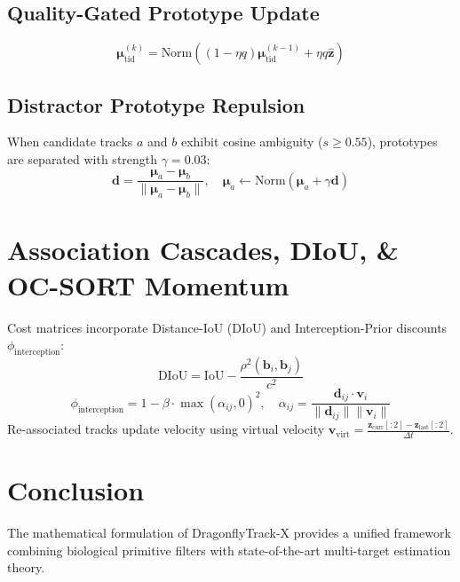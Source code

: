 \documentclass[10pt,journal,compsoc]{IEEEtran}
\begin{document}
\subsection{Quality-Gated Prototype Update}
\begin{equation}
\boldsymbol{\mu}_{\text{tid}}^{(k)} = \text{Norm}\left( (1 - \eta q) \boldsymbol{\mu}_{\text{tid}}^{(k-1)} + \eta q \hat{\mathbf{z}} \right)
\end{equation}

\subsection{Distractor Prototype Repulsion}
When candidate tracks $a$ and $b$ exhibit cosine ambiguity ($s \ge 0.55$), prototypes are separated with strength $\gamma = 0.03$:
\begin{equation}
\mathbf{d} = \frac{\boldsymbol{\mu}_a - \boldsymbol{\mu}_b}{\|\boldsymbol{\mu}_a - \boldsymbol{\mu}_b\|}, \quad \boldsymbol{\mu}_a \leftarrow \text{Norm}(\boldsymbol{\mu}_a + \gamma \mathbf{d})
\end{equation}

\section{Association Cascades, DIoU, \& OC-SORT Momentum}
Cost matrices incorporate Distance-IoU ($\text{DIoU}$) and Interception-Prior discounts $\phi_{\text{interception}}$:
\begin{equation}
\text{DIoU} = \text{IoU} - \frac{\rho^2(\mathbf{b}_i, \mathbf{b}_j)}{c^2}
\end{equation}
\begin{equation}
\phi_{\text{interception}} = 1 - \beta \cdot \max(\alpha_{ij}, 0)^2, \quad \alpha_{ij} = \frac{\mathbf{d}_{ij} \cdot \mathbf{v}_i}{\|\mathbf{d}_{ij}\| \|\mathbf{v}_i\|}
\end{equation}
Re-associated tracks update velocity using virtual velocity $\mathbf{v}_{\text{virt}} = \frac{\mathbf{z}_{\text{curr}}[:2] - \mathbf{z}_{\text{last}}[:2]}{\Delta t}$.

\section{Conclusion}
The mathematical formulation of DragonflyTrack-X provides a unified framework combining biological primitive filters with state-of-the-art multi-target estimation theory.
\end{document}
